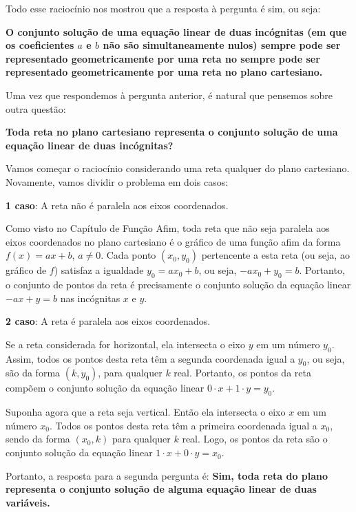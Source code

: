 \begin{observation}
Todo esse raciocínio nos mostrou que a resposta à pergunta é sim, ou seja:

\textbf{O conjunto solução de uma equação linear de duas incógnitas (em que os coeficientes $a$ e $b$ não são simultaneamente nulos) sempre pode ser representado geometricamente por uma reta no sempre pode ser representado geometricamente por uma reta no plano cartesiano.}

\end{observation}

Uma vez que respondemos à pergunta anterior, é natural que pensemos sobre outra questão:


\begin{observation}
\textbf{Toda reta no plano cartesiano representa o conjunto solução de uma equação linear de duas incógnitas?}

Vamos começar o raciocínio considerando uma reta qualquer do plano cartesiano. Novamente, vamos dividir o problema em dois casos:

\textbf{1 caso}: A reta não é paralela aos eixos coordenados.

Como visto no Capítulo de Função Afim, toda reta que não seja paralela aos eixos coordenados no plano cartesiano é o gráfico de uma função afim da forma $f(x) = ax+b$, $a\neq0$. Cada ponto $(x_0,y_0)$ pertencente a esta reta (ou seja, ao gráfico de $f$) satisfaz a igualdade $y_0=ax_0+b$, ou seja, $-ax_0+y_0=b$. Portanto, o conjunto de pontos da reta é precisamente o conjunto solução da equação linear $-ax+y=b$ nas incógnitas $x$ e $y$.

\textbf{2 caso}: A reta é paralela aos eixos coordenados.

Se a reta considerada for horizontal, ela intersecta o eixo $y$ em um número $y_0$. Assim, todos os pontos desta reta têm a segunda coordenada igual a $y_0$, ou seja, são da forma $(k, y_0)$, para qualquer $k$ real. Portanto, os pontos da reta compõem o conjunto solução da equação linear $0\cdot x+1\cdot y=y_0$.

Suponha agora que a reta seja vertical. Então ela intersecta o eixo $x$ em um número $x_0$. Todos os pontos desta reta têm a primeira coordenada igual a $x_0$, sendo da forma $(x_0,k)$ para qualquer $k$ real. Logo, os pontos da reta são o conjunto solução da equação linear $1\cdot x+0\cdot y=x_0$.

Portanto, a resposta para a segunda pergunta é: \textbf{Sim, toda reta do plano representa o conjunto solução de alguma equação linear de duas variáveis.}
\end{observation}

